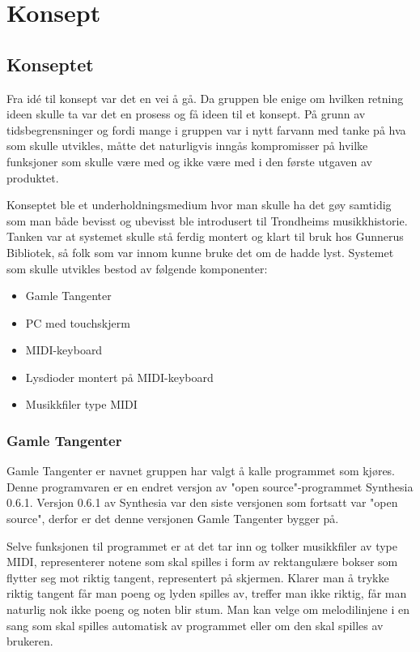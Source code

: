 \chapter{Konsept}
\section{Konseptet}
Fra idé til konsept var det en vei å gå. Da gruppen ble enige om hvilken retning ideen skulle ta var det en prosess og få ideen til et konsept. På grunn av tidsbegrensninger og fordi mange i gruppen var i nytt farvann med tanke på hva som skulle utvikles, måtte det naturligvis inngås kompromisser på hvilke funksjoner som skulle være med og ikke være med i den første utgaven av produktet.

Konseptet ble et underholdningsmedium hvor man skulle ha det gøy samtidig som man både bevisst og ubevisst ble introdusert til Trondheims musikkhistorie. Tanken var at systemet skulle stå ferdig montert og klart til bruk hos Gunnerus Bibliotek, så folk som var innom kunne bruke det om de hadde lyst. Systemet som skulle utvikles bestod av følgende komponenter:

\begin{itemize}

\item{Gamle Tangenter}

\item{PC med touchskjerm}

\item{MIDI-keyboard\cite{midikeyboard}}

\item{Lysdioder montert på MIDI-keyboard}

\item{Musikkfiler type MIDI\cite{midi}}

\end{itemize}

\subsection{Gamle Tangenter}
Gamle Tangenter er navnet gruppen har valgt å kalle programmet som kjøres. Denne programvaren er en endret versjon av "open source"-programmet Synthesia 0.6.1\cite{synthesia}. Versjon 0.6.1 av Synthesia var den siste versjonen som fortsatt var "open source"\cite{opensource}, derfor er det denne versjonen Gamle Tangenter bygger på. 

Selve funksjonen til programmet er at det tar inn og tolker musikkfiler av type MIDI, representerer notene som skal spilles i form av rektangulære bokser som flytter seg mot riktig tangent, representert på skjermen. Klarer man å trykke riktig tangent får man poeng og lyden spilles av, treffer man ikke riktig, får man naturlig nok ikke poeng og noten blir stum. Man kan velge om melodilinjene i en sang som skal spilles automatisk av programmet eller om den skal spilles av brukeren. 

